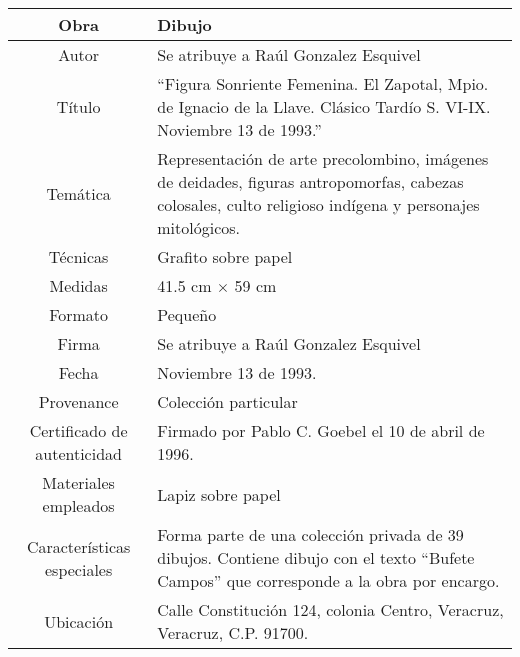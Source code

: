 \documentclass[10pt,letter]{report}
\begin{document}
\begin{table}[H]
\centering
\begin{tabular}{|c|m{}|}
\hline
Obra& Dibujo	\\
\hline
Autor & Se atribuye a Ra\'ul Gonzalez Esquivel\\
\hline
T\'itulo & ``Figura Sonriente Femenina. El Zapotal, Mpio. de Ignacio de la Llave. Cl\'asico Tard\'io S. VI-IX. Noviembre 13 de 1993.''\\
\hline
Tem\'atica & Representaci\'on de arte precolombino, im\'agenes de deidades, figuras antropomorfas, cabezas colosales, culto religioso ind\'igena y personajes mitol\'ogicos.\\
\hline
T\'ecnicas &Grafito sobre papel \\
\hline
Medidas & 41.5 cm $\times$ 59 cm \\
\hline
 Formato & Peque\~no \\
 \hline
 Firma & Se atribuye a Ra\'ul Gonzalez Esquivel\\ 
 \hline
  Fecha & Noviembre 13 de 1993. \\
 \hline
 Provenance & Colecci\'on particular\\
 \hline
 Certificado de autenticidad& Firmado por Pablo C. Goebel el 10 de abril de 1996.  \\
 \hline 
  Materiales empleados & Lapiz sobre papel\\
 \hline
 Caracter\'isticas especiales & Forma parte de una colecci\'on privada de 39 dibujos. 
Contiene dibujo con el texto ``Bufete Campos'' que corresponde a la obra por encargo. \\
\hline 
Ubicaci\'on & Calle Constituci\'on 124, colonia Centro, Veracruz, Veracruz, C.P. 91700.\\
\hline

\end{tabular}
\end{table}
\end{document}

